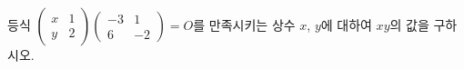 \hspace*{2mm}\begin{minipage}[t]{\dimexpr\linewidth-2mm\relax}\vspace{0pt}
등식 $\begin{pmatrix} x & 1 \\ y & 2 \end{pmatrix}\begin{pmatrix} -3 & 1 \\ 6 & -2 \end{pmatrix}=O$를 만족시키는 상수 $x$, $y$에 대하여 $xy$의 값을 구하시오. \end{minipage}
